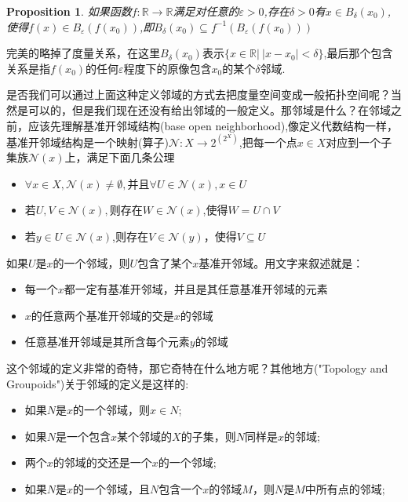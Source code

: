 \documentclass{article}
\newtheorem{proposition}[theorem]{Proposition}
\newcommand*{\xfunc}[4]{{#2}\colon{#3}{#1}{#4}}
\newcommand*{\func}[3]{\xfunc{\to}{#1}{#2}{#3}}
\begin{document}
\begin{proposition}
如果函数$\func{f}{\mathbb{R}}{\mathbb{R}}$满足对任意的$\varepsilon > 0$,存在$\delta > 0$有$x \in B_{\delta}(x_0)$,使得$f(x) \in B_{\varepsilon}(f(x_0))$,即$B_{\delta}(x_0) \subseteq f^{-1}(B_{\varepsilon}(f(x_0)))$
\end{proposition}

完美的略掉了度量关系，在这里$B_{\delta}(x_0)$表示$\{x \in \mathbb{R} |\ |x-x_0| < \delta \}$,最后那个包含关系是指$f(x_0)$的任何$\varepsilon$程度下的原像包含$x_0$的某个$\delta$邻域.

是否我们可以通过上面这种定义邻域的方式去把度量空间变成一般拓扑空间呢？当然是可以的，但是我们现在还没有给出邻域的一般定义。那邻域是什么？在邻域之前，应该先理解基准开邻域结构(base open neighborhood),像定义代数结构一样，基准开邻域结构是一个映射(算子)$\func{\mathcal{N}}{X}{2^(2^X)}$,把每一个点$x \in X$对应到一个子集族$\mathcal{N}(x)$上，满足下面几条公理
		\begin{itemize}
			\item $\forall x \in X,\mathcal{N}(x) \neq \emptyset,$并且$\forall U \in \mathcal{N}(x),x \in U$
			\item 若$U,V \in \mathcal{N}(x),$则存在$W \in \mathcal{N}(x)$,使得$W = U \cap V$
			\item 若$y \in U \in \mathcal{N}(x)$,则存在$V \in \mathcal{N}(y)$，使得$V \subseteq U$
		\end{itemize}
如果$U$是$x$的一个邻域，则$U$包含了某个$x$基准开邻域。用文字来叙述就是：
\begin{itemize}
	\item 每一个$x$都一定有基准开邻域，并且是其任意基准开邻域的元素
	\item $x$的任意两个基准开邻域的交是$x$的邻域
	\item 任意基准开邻域是其所含每个元素$y$的邻域
\end{itemize}

这个邻域的定义非常的奇特，那它奇特在什么地方呢？其他地方("Topology and Groupoids")关于邻域的定义是这样的:
\begin{itemize}
	\item 如果$N$是$x$的一个邻域，则$x \in N$;
	\item 如果$N$是一个包含$x$某个邻域的$X$的子集，则$N$同样是$x$的邻域;
	\item 两个$x$的邻域的交还是一个$x$的一个邻域;
	\item 如果$N$是$x$的一个邻域，且$N$包含一个$x$的邻域$M$，则$N$是$M$中所有点的邻域;
\end{itemize}
\end{document}
